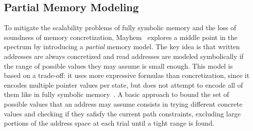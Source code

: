 
\subsection{Partial Memory Modeling}
\label{ss:index-based-memory}

To mitigate the scalability problems of fully symbolic memory and the loss of soundness of memory concretization,
{\sc Mayhem}~\cite{MAYHEM-SP12} explores a middle point in the spectrum by introducing a {\em partial} memory model. The key idea is that written addresses are always concretized and read addresses are modeled symbolically if the range of possible values they may assume is small enough. This model is based on a trade-off: it uses more expressive formulas than concretization, since it encodes multiple pointer values per state, but does not attempt to encode all of them like in fully symbolic memory~\cite{MAYHEM-THESIS}. A basic approach to bound the set of possible values that an address may assume consists in trying different concrete values and checking if they safisfy the current path constraints, excluding large portions of the address space at each trial until a tight range is found.  
